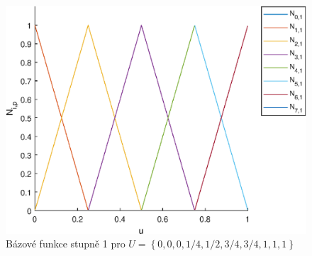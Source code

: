\begin{priklad}
	\begin{figure}[!h]
		\begin{center}
			\includegraphics*[]{obr/graf1}
		\end{center}
		\caption{Bázové funkce stupně 1 pro $U=\left\lbrace 0,0,0,1/4,1/2,3/4,3/4,1,1,1\right\rbrace $}
		\label{graf1}
	\end{figure}


\end{priklad}
